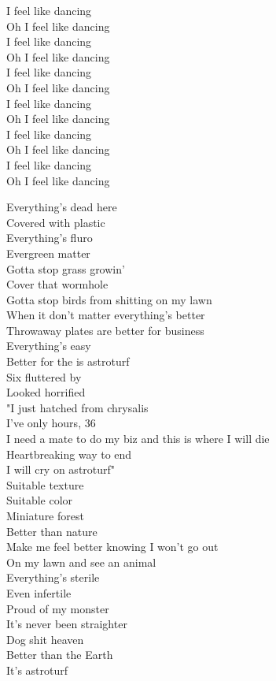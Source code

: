 I feel like dancing \\
Oh I feel like dancing \\
I feel like dancing \\
Oh I feel like dancing \\
I feel like dancing \\
Oh I feel like dancing \\
I feel like dancing \\
Oh I feel like dancing \\
I feel like dancing \\
Oh I feel like dancing \\
I feel like dancing \\
Oh I feel like dancing \\




Everything's dead here \\
Covered with plastic \\
Everything's fluro \\
Evergreen matter \\
Gotta stop grass growin' \\
Cover that wormhole \\
Gotta stop birds from shitting on my lawn \\
When it don't matter everything's better \\
Throwaway plates are better for business \\
Everything's easy \\
Better for the  is astroturf \\

Six  fluttered by \\
Looked horrified \\
"I just hatched from chrysalis \\
I've only hours, 36 \\
I need a mate to do my biz and this is where I will die \\
Heartbreaking way to end \\
I will cry on astroturf" \\

Suitable texture \\
Suitable color \\
Miniature forest \\
Better than nature \\
Make me feel better knowing I won't go out \\
On my lawn and see an animal \\
Everything's sterile \\
Even infertile \\
Proud of my monster \\
It's never been straighter \\
Dog shit heaven \\
Better than the Earth \\
It's astroturf \\


